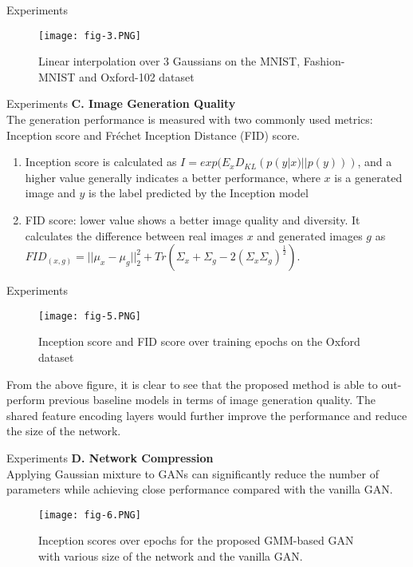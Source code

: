 \documentclass{beamer}
\begin{document}
\begin{frame}{Experiments}

\begin{figure}[!tbp]
  \centering
  {\texttt{[image: fig-3.PNG]}}
  \hfill
  
  \caption{Linear interpolation over 3 Gaussians on the MNIST, Fashion-MNIST and Oxford-102 dataset}
\end{figure}
\end{frame}



\begin{frame}{Experiments}
 \textbf{C. Image Generation Quality\\} 
 The generation performance is measured with two
commonly used metrics: Inception score and Fréchet Inception Distance (FID) score.
\begin{enumerate}
 \item Inception score is calculated as $I = exp(E_x D_{KL}(p(y|x)||p(y)))$, and a higher value generally indicates a better performance, where $x$
is a generated image and $y$ is the label predicted by
the Inception model
\item FID score: lower value shows a better image quality and diversity. It calculates the difference between real images $x$ and generated images
$g$ as $FID_{(x, g)} = ||\mu_x - \mu_g||^2_{2} + Tr(\Sigma_x + \Sigma_g - 2(\Sigma_x\Sigma_g)^\frac{1}{2} )$.
\end{enumerate}
\end{frame}



\begin{frame}{Experiments}
\begin{figure}[!tbp]
  \centering
  {\texttt{[image: fig-5.PNG]}}
  \hfill
  
  \caption{Inception score and FID score over training epochs on the Oxford dataset}
\end{figure}
From the above figure, it is clear to see that the proposed method is able to out-perform previous baseline models in terms of image generation quality. The
shared feature encoding layers would further improve the performance and reduce the size of the network.
\end{frame}



\begin{frame}{Experiments}
 \textbf{D. Network Compression\\} 
Applying Gaussian mixture to GANs can significantly reduce the number of
parameters while achieving close performance compared with the vanilla GAN.
\begin{figure}[!tbp]
  \centering
  {\texttt{[image: fig-6.PNG]}}
  \hfill
  
  \caption{Inception scores over epochs for the proposed GMM-based GAN with various size of the network and the vanilla GAN.}
\end{figure}
\end{frame}
\end{document}

